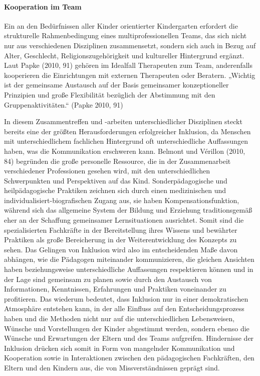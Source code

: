 \paragraph{Kooperation im Team}\label{Team}

Ein an den Bedürfnissen aller Kinder orientierter Kindergarten erfordert die strukturelle Rahmenbedingung eines multiprofessionellen Teams, das sich nicht nur aus verschiedenen Disziplinen zusammensetzt, sondern sich auch in Bezug auf Alter, Geschlecht, Religionszugehörigkeit und kultureller Hintergrund ergänzt.
Laut Papke (2010, 91) gehören im Idealfall Therapeuten zum Team, anderenfalls kooperieren die Einrichtungen mit externen Therapeuten oder Beratern. „Wichtig ist der gemeinsame Austausch auf der Basis gemeinsamer konzeptioneller Prinzipien und große Flexibilität bezüglich der Abstimmung mit den Gruppenaktivitäten.“ (Papke 2010, 91)

In diesem Zusammentreffen und -arbeiten unterschiedlicher Disziplinen steckt bereits eine der größten Herausforderungen erfolgreicher Inklusion, da Menschen mit unterschiedlichem fachlichen Hintergrund  oft unterschiedliche Auffassungen haben, was die Kommunikation erschweren kann. 
Belmont und Vérillon (2010, 84) begründen die große personelle Ressource, die in der Zusammenarbeit verschiedener Professionen  gesehen wird, mit den unterschiedlichen Schwerpunkten und Perspektiven auf das Kind. Sonderpädagogische und heilpädagogische Praktiken zeichnen sich durch einen medizinischen und individualisiert-biografischen Zugang aus, sie haben Kompensationsfunktion, während sich das allgemeine System der Bildung und Erziehung traditionsgemäß eher an der Schaffung gemeinsamer Lernsituationen ausrichtet. Somit sind die spezialisierten Fachkräfte in der Bereitstellung ihres Wissens und bewährter Praktiken als große Bereicherung in der Weiterentwicklung des Konzepts zu sehen.
Das Gelingen von Inklusion wird also im entscheidenden Maße davon abhängen, wie die Pädagogen miteinander kommunizieren, die gleichen Ansichten haben beziehungsweise unterschiedliche Auffassungen respektieren können und in der Lage sind gemeinsam zu planen sowie durch den Austausch von Informationen, Kenntnissen, Erfahrungen und Praktiken voneinander zu profitieren. Das wiederum bedeutet, dass Inklusion nur in einer demokratischen Atmosphäre entstehen kann, in der alle Einfluss auf den Entscheidungsprozess haben und die Methoden nicht nur auf die unterschiedlichen Lebensweisen, Wünsche und Vorstellungen der Kinder abgestimmt werden, sondern ebenso die Wünsche und Erwartungen der Eltern und des Teams aufgreifen.
Hindernisse der Inklusion drücken sich somit in Form von mangelnder Kommunikation und Kooperation sowie in Interaktionen zwischen den pädagogischen Fachkräften, den Eltern und den Kindern aus, die von Missverständnissen geprägt sind.

